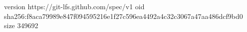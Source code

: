 version https://git-lfs.github.com/spec/v1
oid sha256:f8aca79989e847f094595216e1f27c596ea4492a4c32c3067a47aa486dcf9bd0
size 349692

